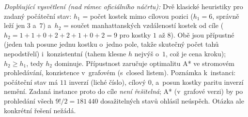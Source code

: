 \medskip
\noindent\textit{Doplňující vysvětlení (nad rámec oficiálního náčrtu):} Dvě klasické heuristiky pro zadaný počáteční stav: $h_1$ = počet kostek mimo cílovou pozici ($h_1=6$, správně leží jen $3$ a~$7$) a~$h_2$ = součet manhattanských vzdáleností kostek od cíle ($h_2=1+1+0+2+2+1+0+2=9$ pro kostky $1$ až $8$). Obě jsou přípustné (jeden tah posune jednu kostku o~jedno pole, takže skutečný počet tahů nepodstřelí) i~konzistentní (tahem klesne $h$ nejvýš o~$1$, což je cena kroku); $h_2\ge h_1$, tedy $h_2$ dominuje. Přípustnost zaručuje optimalitu A* ve stromovém prohledávání, konzistence v~grafovém (s~closed listem). Poznámka k~instanci: počáteční stav má $11$ inverzí (liché číslo), cílový $0$, a~posun kostky paritu inverzí nemění. Zadaná instance proto do cíle \emph{není řešitelná}; A* (v~grafové verzi) by po prohledání všech $9!/2=181\,440$ dosažitelných stavů ohlásil neúspěch. Otázka ale konkrétní řešení nežádá.
